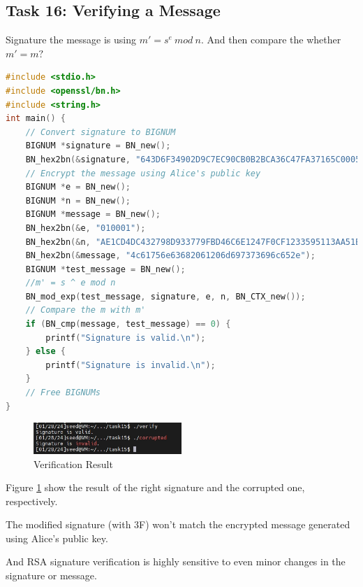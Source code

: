 \documentclass[a4paper,11pt]{article}
\begin{document}
\subsection{Task 16: Verifying a Message}
Signature the message is using $m' = s^e\ mod\ n$. And then compare the whether $m' = m?$
\begin{lstlisting}[caption={C Program Code for Verifying},label={lst:task4.16},language=C,breaklines=true]
#include <stdio.h>
#include <openssl/bn.h>
#include <string.h>
int main() {
    // Convert signature to BIGNUM
    BIGNUM *signature = BN_new();
    BN_hex2bn(&signature, "643D6F34902D9C7EC90CB0B2BCA36C47FA37165C0005CAB026C0542CBDB6802F");
    // Encrypt the message using Alice's public key
    BIGNUM *e = BN_new();
    BIGNUM *n = BN_new();
    BIGNUM *message = BN_new();
    BN_hex2bn(&e, "010001");
    BN_hex2bn(&n, "AE1CD4DC432798D933779FBD46C6E1247F0CF1233595113AA51B450F18116115");
    BN_hex2bn(&message, "4c61756e63682061206d697373696c652e");
    BIGNUM *test_message = BN_new();
    //m' = s ^ e mod n
    BN_mod_exp(test_message, signature, e, n, BN_CTX_new());
    // Compare the m with m'
    if (BN_cmp(message, test_message) == 0) {
        printf("Signature is valid.\n");
    } else {
        printf("Signature is invalid.\n");
    }
    // Free BIGNUMs
}
\end{lstlisting} 
\begin{figure}[h]
    \centering
       \includegraphics[width=0.5\textwidth]{figures/task16/messageverify.png}
    \caption{Verification Result}\label{fig:task16}
\end{figure}
Figure \ref{fig:task16} show the result of the right signature and  the corrupted one, respectively. 

The modified signature (with 3F) won't match the encrypted message generated using Alice's public key. 

And RSA signature verification is highly sensitive to even minor changes in the signature or message.
\end{document}
